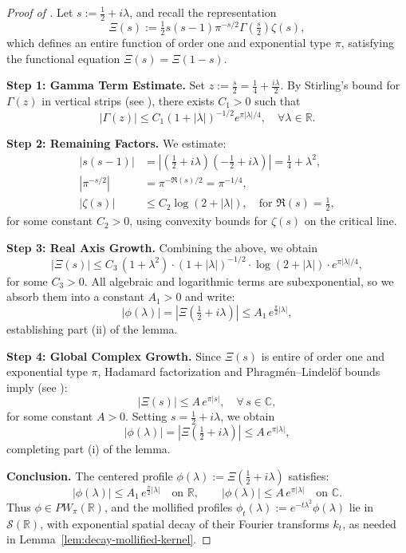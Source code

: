 \begin{proof}[Proof of ]
Let \( s := \tfrac{1}{2} + i\lambda \), and recall the representation
\[
\Xi(s) := \tfrac{1}{2}s(s-1)\pi^{-s/2} \Gamma\left( \tfrac{s}{2} \right) \zeta(s),
\]
which defines an entire function of order one and exponential type \( \pi \), satisfying the functional equation \( \Xi(s) = \Xi(1 - s) \).

\medskip
\noindent\textbf{Step 1: Gamma Term Estimate.}
Set \( z := \tfrac{s}{2} = \tfrac{1}{4} + \tfrac{i\lambda}{2} \). By Stirling’s bound for \( \Gamma(z) \) in vertical strips (see \cite[Eq.~(1.5.3)]{Titchmarsh1986Zeta}), there exists \( C_1 > 0 \) such that
\[
|\Gamma(z)| \le C_1 (1 + |\lambda|)^{-1/2} e^{\pi |\lambda| / 4}, \quad \forall \lambda \in \mathbb{R}.
\]

\medskip
\noindent\textbf{Step 2: Remaining Factors.}
We estimate:
\begin{align*}
|s(s - 1)| &= \left| \left( \tfrac{1}{2} + i\lambda \right)\left( -\tfrac{1}{2} + i\lambda \right) \right| = \tfrac{1}{4} + \lambda^2, \\
|\pi^{-s/2}| &= \pi^{-\Re(s)/2} = \pi^{-1/4}, \\
|\zeta(s)| &\le C_2 \log(2 + |\lambda|), \quad \text{for } \Re(s) = \tfrac{1}{2},
\end{align*}
for some constant \( C_2 > 0 \), using convexity bounds for \( \zeta(s) \) on the critical line.

\medskip
\noindent\textbf{Step 3: Real Axis Growth.}
Combining the above, we obtain
\[
|\Xi(s)| \le C_3\, (1 + \lambda^2) \cdot (1 + |\lambda|)^{-1/2} \cdot \log(2 + |\lambda|) \cdot e^{\pi |\lambda| / 4},
\]
for some \( C_3 > 0 \). All algebraic and logarithmic terms are subexponential, so we absorb them into a constant \( A_1 > 0 \) and write:
\[
|\phi(\lambda)| = |\Xi(\tfrac{1}{2} + i\lambda)| \le A_1\, e^{\tfrac{\pi}{2} |\lambda|},
\]
establishing part (ii) of the lemma.

\medskip
\noindent\textbf{Step 4: Global Complex Growth.}
Since \( \Xi(s) \) is entire of order one and exponential type \( \pi \), Hadamard factorization and Phragmén–Lindelöf bounds imply (see \cite[Ch.~3]{Levin1996EntireLectures}):
\[
|\Xi(s)| \le A\, e^{\pi |s|}, \quad \forall\, s \in \mathbb{C},
\]
for some constant \( A > 0 \). Setting \( s = \tfrac{1}{2} + i\lambda \), we obtain
\[
|\phi(\lambda)| = |\Xi(\tfrac{1}{2} + i\lambda)| \le A\, e^{\pi |\lambda|},
\]
completing part (i) of the lemma.

\medskip
\noindent\textbf{Conclusion.}
The centered profile \( \phi(\lambda) := \Xi(\tfrac{1}{2} + i\lambda) \) satisfies:
\[
|\phi(\lambda)| \le A_1\, e^{\frac{\pi}{2}|\lambda|} \quad \text{on } \mathbb{R}, \qquad |\phi(\lambda)| \le A\, e^{\pi|\lambda|} \quad \text{on } \mathbb{C}.
\]
Thus \( \phi \in PW_\pi(\mathbb{R}) \), and the mollified profiles \( \phi_t(\lambda) := e^{-t\lambda^2} \phi(\lambda) \) lie in \( \mathcal{S}(\mathbb{R}) \), with exponential spatial decay of their Fourier transforms \( k_t \), as needed in Lemma~\ref{lem:decay-mollified-kernel}.
\end{proof}
